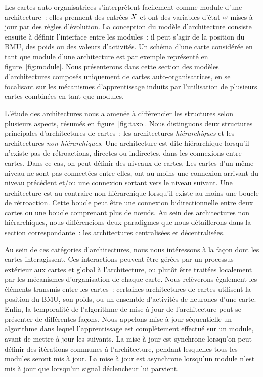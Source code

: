 \documentclass[../main]{subfiles}
\begin{document}
Les cartes auto-organisatrices s'interprètent facilement comme module d'une architecture~: elles prennent des entrées $X$ et ont des variables d'état $\omega$ mises à jour par des règles d'évolution. La conception du modèle d'architecture consiste ensuite à définir l'interface entre les modules~: il peut s'agir de la position du BMU, des poids ou des valeurs d'activités. 
Un schéma d'une carte considérée en tant que module d'une architecture est par exemple représenté en figure~\ref{fig:module}. 
Nous présenterons dans cette section des modèles d'architectures composés uniquement de cartes auto-organisatrices, en se focalisant sur les mécanismes d'apprentissage induits par l'utilisation de plusieurs cartes combinées en tant que modules.

L'étude des architectures nous a amenée à différencier les structures selon plusieurs aspects, résumés en figure~\ref{fig:taxo}.
Nous distinguons deux structures principales d'architectures de cartes~: les architectures \emph{hiérarchiques} et les architectures \emph{non hiérarchiques}.
Une architecture est dite hiérarchique lorsqu'il n'existe pas de rétroactions, directes ou indirectes, dans les connexions entre cartes. Dans ce cas, on peut définir des niveaux de cartes. Les cartes d'un même niveau ne sont pas connectées entre elles, ont au moins une connexion arrivant du niveau précédent et/ou une connexion sortant vers le niveau suivant.
Une architecture est au contraire non hiérarchique lorsqu'il existe au moins une boucle de rétroaction. Cette boucle peut être une connexion bidirectionnelle entre deux cartes ou une boucle comprenant plus de n\oe{}uds.
Au sein des architectures non hiérarchiques, nous différencions deux paradigmes que nous détaillerons dans la section correspondante~: les architectures centralisées et décentralisées.

Au sein de ces catégories d'architectures, nous nous intéressons à la façon dont les cartes interagissent.
Ces interactions peuvent être gérées par un processus extérieur aux cartes et global à l'architecture, ou plutôt être traitées localement par les mécanismes d'organisation de chaque carte.
Nous relèverons également les éléments transmis entre les cartes~:
certaines architectures de cartes utilisent la position du BMU, son poids, ou un ensemble d'activités de neurones d'une carte.
Enfin, la temporalité de l'algorithme de mise à jour de l'architecture peut se présenter de différentes façons. Nous appelons mise à jour séquentielle un algorithme dans lequel l'apprentissage est complètement effectué sur un module, avant de mettre à jour les suivants. La mise à jour est synchrone lorsqu'on peut définir des itérations communes à l'architecture, pendant lesquelles tous les modules seront mis à jour. La mise à jour est asynchrone lorsqu'un module n'est mis à jour que lorsqu'un signal déclencheur lui parvient.
\end{document}

